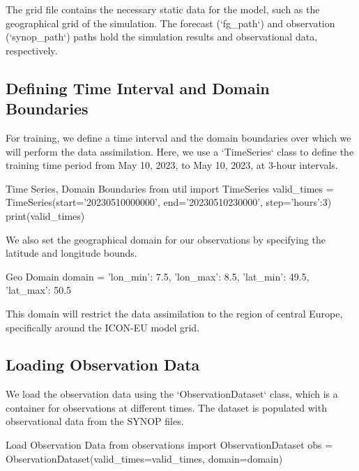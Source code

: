 The grid file contains the necessary static data for the model, such as the geographical grid of the simulation. The forecast (`fg\_path`) and observation (`synop\_path`) paths hold the simulation results and observational data, respectively.

%
\subsection{Defining Time Interval and Domain Boundaries}

For training, we define a time interval and the domain boundaries over which we will perform the data assimilation. Here, we use a `TimeSeries` class to define the training time period from May 10, 2023, to May 10, 2023, at 3-hour intervals.

\begin{codeonly}{Time Series, Domain Boundaries}
from util import TimeSeries
valid_times = TimeSeries(start='20230510000000', end='20230510230000', step={'hours':3})
print(valid_times)
\end{codeonly}

We also set the geographical domain for our observations by specifying the latitude and longitude bounds.

\begin{codeonly}{Geo Domain}
domain = {'lon_min': 7.5, 'lon_max': 8.5, 'lat_min': 49.5, 'lat_max': 50.5}
\end{codeonly}

This domain will restrict the data assimilation to the region of central Europe, specifically around the ICON-EU model grid.

%
\subsection{Loading Observation Data}

We load the observation data using the `ObservationDataset` class, which is a container for observations at different times. The dataset is populated with observational data from the SYNOP files.

\begin{codeonly}{Load Observation Data}
from observations import ObservationDataset
obs = ObservationDataset(valid_times=valid_times, domain=domain)
\end{codeonly}

